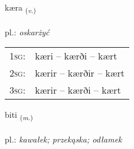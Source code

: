 \documentclass[frontgrid, backgrid]{flacards}\usepackage[]{graphicx}\usepackage[]{xcolor}
\begin{document}
\renewcommand{\flhead}{\vskip5pt \fboxsep=0pt {\small\bfseries\footnotesize Sagnorð | czasownik}}
\renewcommand{\fcfoot}{\vskip5pt \fboxsep=0pt \hspace{2pt}{\small\bfseries\footnotesize 3K}}

\renewcommand{\blhead}{\vskip5pt {\small\bfseries\footnotesize Sagnorð | czasownik }}
\renewcommand{\bcfoot}{\vskip5pt \hspace{2pt}{\small\bfseries\footnotesize 3K}}


{kæra \small{\textsubscript{(\textit{v.})}} \\[1ex] %
\textphonetic{[cʰaiːra]} \\
pl.: \emph{oskarżyć} \\  [2ex]
\renewcommand*{\arraystretch}{0.8}
\begin{tabular}{p{1cm}l}
\textsc{1sg}: & kæri -- kærði -- kært \\ 
\textsc{2sg}: & kærir -- kærðir -- kært \\ 
\textsc{3sg}: & kærir -- kærði -- kært \\ 
\end{tabular}
}

\renewcommand{\flhead}{\vskip5pt \fboxsep=0pt {\small\bfseries\footnotesize Nafnorð | rzeczownik}}
\renewcommand{\fcfoot}{\vskip5pt \fboxsep=0pt \hspace{2pt}{\small\bfseries\footnotesize 3K}}

\renewcommand{\blhead}{\vskip5pt {\small\bfseries\footnotesize Nafnorð | rzeczownik }}
\renewcommand{\bcfoot}{\vskip5pt \hspace{2pt}{\small\bfseries\footnotesize 3K}}


{biti \small{\textsubscript{(\textit{m.})}} \\[1ex] %
\textphonetic{[pɪːtɪ]} \\
pl.: \emph{kawałek; przekąska; odłamek} \\  [2ex]
\renewcommand*{\arraystretch}{0.8}
}
\end{document}
